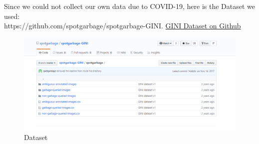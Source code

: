 
Since we could not collect our own data due to COVID-19, here is the Dataset we used:\\
https://github.com/spotgarbage/spotgarbage-GINI.
\href{https://github.com/spotgarbage/spotgarbage-GINI}{GINI Dataset on Github} 

\begin{figure}[!hb]
   
    \centering
        \includegraphics[scale=0.7]{images/Dataset.PNG}

 
   \caption{Dataset}\label{fig:GINIdataset}
\end{figure}